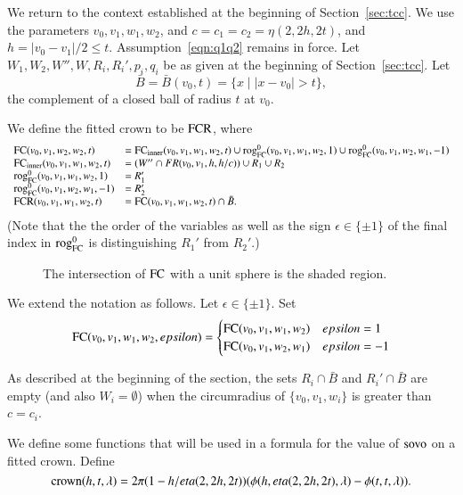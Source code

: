We return to the context established at the beginning
of Section~\ref{sec:tcc}.  We use the parameters $v_0,v_1,w_1,w_2$,
and $c=c_1=c_2=\eta(2,2h,2t)$, and $h =|v_0-v_1|/2 \le t$. 
Assumption~\ref{eqn:q1q2} remains in force.
Let $W_1,W_2,W'',W,R_i,R_i',p_i,q_i$ be as given at the
beginning of Section~\ref{sec:tcc}.
%
Let 
  $$\bar B = \bar B(v_0,t) = \{x \mid |x-v_0| > t\},$$
the complement of a closed ball of radius $t$ at $v_0$.
%
\begin{definition}\label{def:fitted-crown}
We define the fitted crown to be ${\operatorname{FCR}}$, where
$$
\begin{array}{lll}
\FC(v_0,v_1,w_2,w_2,t) &= \FCinner(v_0,v_1,w_1,w_2,t) \cup 
      \rogFC (v_0,v_1,w_1,w_2,1)\cup \rogFC(v_0,v_1,w_2,w_1,-1)\\
%
\FCinner(v_0,v_1,w_1,w_2,t) &= (W'' \cap FR(v_0,v_1,h,h/c))\cup R_1 \cup R_2 \\
%
\rogFC (v_0,v_1,w_1,w_2,1) &= R_1'\\
\rogFC (v_0,v_1,w_2,w_1,-1) &= R_2'\\
%
\FCR(v_0,v_1,w_1,w_2,t) &= \FC(v_0,v_1,w_1,w_2,t) \cap \bar B.
\end{array}
$$
(Note that the the order of the variables as well as the sign $\epsilon\in\{\pm1\}$ of the final index in ${\operatorname{rog}}^0_{\text{FC}}$ is distinguishing $R_1'$ from $R_2'$.)
\end{definition}


\begin{figure}[htb]
  \centering
  \caption{The intersection of
    ${\operatorname{FC}}$ with a unit sphere is the shaded region.}
  \label{fig:anchor-quarter}
\end{figure}

We extend the notation as follows.  Let $\epsilon\in\{\pm 1\}$.
Set
  $$
    {\operatorname{FC}}(v_0,v_1,w_1,w_2,epsilon) = \begin{cases}
      {\operatorname{FC}}(v_0,v_1,w_1,w_2) & epsilon = 1\\
      {\operatorname{FC}}(v_0,v_1,w_2,w_1) & epsilon = -1\\
    \end{cases}
  $$

As described at the beginning of the section, the 
sets $R_i\cap \bar B$ and $R_i'\cap \bar B$ are empty
(and also $W_i=\emptyset$) when the circumradius of 
$\{v_0,v_1,w_i\}$ is greater than $c=c_i$.

We define some functions that will be used in a formula
for the value of ${\operatorname{sovo}}$ on a fitted crown.
Define
\begin{equation}\operatorname{crown}(h,t,\lambda) =
2\pi(1-h/eta(2,2h,2t))(\phi(h,eta(2,2h,2t),\lambda)-\phi(t,t,\lambda)). 
\end{equation} 


